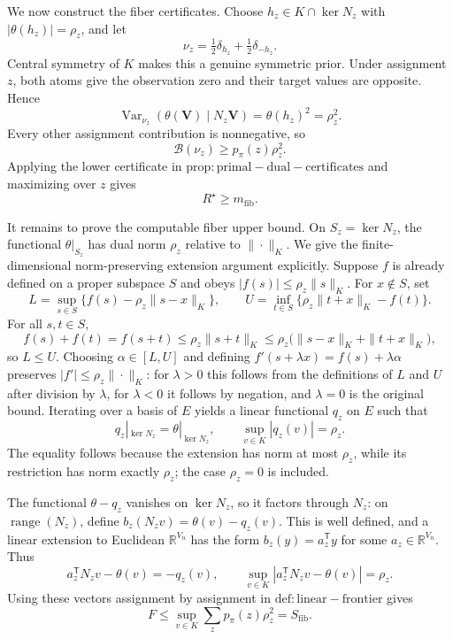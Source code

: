 We now construct the fiber certificates. Choose \(h_z\in K\cap\ker N_z\) with \(|\theta(h_z)|=\rho_z\), and let
\[
 \nu_z=\tfrac12\delta_{h_z}+\tfrac12\delta_{-h_z}.
\]
Central symmetry of \(K\) makes this a genuine symmetric prior. Under assignment \(z\), both atoms give the observation zero and their target values are opposite. Hence
\[
 \operatorname{Var}_{\nu_z}(\theta(\mathbf V)\mid N_z\mathbf V)
 =\theta(h_z)^2=\rho_z^2.
\]
Every other assignment contribution is nonnegative, so
\[
 \mathcal B(\nu_z)\ge p_{\pi}(z)\rho_z^2.
\]
Applying the lower certificate in \(\mathrm{prop:primal-dual-certificates}\) and maximizing over \(z\) gives
\[
 R^{\star}\ge m_{\mathrm{fib}}.
\]

It remains to prove the computable fiber upper bound. On \(S_z=\ker N_z\), the functional \(\theta|_{S_z}\) has dual norm \(\rho_z\) relative to \(\|\cdot\|_K\). We give the finite-dimensional norm-preserving extension argument explicitly. Suppose \(f\) is already defined on a proper subspace \(S\) and obeys \(|f(s)|\le\rho_z\|s\|_K\). For \(x\notin S\), set
\[
 L=\sup_{s\in S}\{f(s)-\rho_z\|s-x\|_K\},
 \qquad
 U=\inf_{t\in S}\{\rho_z\|t+x\|_K-f(t)\}.
\]
For all \(s,t\in S\),
\[
 f(s)+f(t)=f(s+t)
 \le\rho_z\|s+t\|_K
 \le\rho_z\bigl(\|s-x\|_K+\|t+x\|_K\bigr),
\]
so \(L\le U\). Choosing \(\alpha\in[L,U]\) and defining
\(
f'(s+\lambda x)=f(s)+\lambda\alpha
\)
preserves \(|f'|\le\rho_z\|\cdot\|_K\): for \(\lambda>0\) this follows from the definitions of \(L\) and \(U\) after division by \(\lambda\), for \(\lambda<0\) it follows by negation, and \(\lambda=0\) is the original bound. Iterating over a basis of \(E\) yields a linear functional \(q_z\) on \(E\) such that
\[
 q_z|_{\ker N_z}=\theta|_{\ker N_z},
 \qquad
 \sup_{v\in K}|q_z(v)|=\rho_z.
\]
The equality follows because the extension has norm at most \(\rho_z\), while its restriction has norm exactly \(\rho_z\); the case \(\rho_z=0\) is included.

The functional \(\theta-q_z\) vanishes on \(\ker N_z\), so it factors through \(N_z\): on \(\operatorname{range}(N_z)\), define \(b_z(N_zv)=\theta(v)-q_z(v)\). This is well defined, and a linear extension to Euclidean \(\mathbb R^{V_n}\) has the form \(b_z(y)=a_z^{\mathsf T}y\) for some \(a_z\in\mathbb R^{V_n}\). Thus
\[
 a_z^{\mathsf T}N_zv-\theta(v)=-q_z(v),
 \qquad
 \sup_{v\in K}|a_z^{\mathsf T}N_zv-\theta(v)|=\rho_z.
\]
Using these vectors assignment by assignment in \(\mathrm{def:linear-frontier}\) gives
\[
 F\le\sup_{v\in K}\sum_zp_{\pi}(z)\rho_z^2
 =S_{\mathrm{fib}}.
\]

